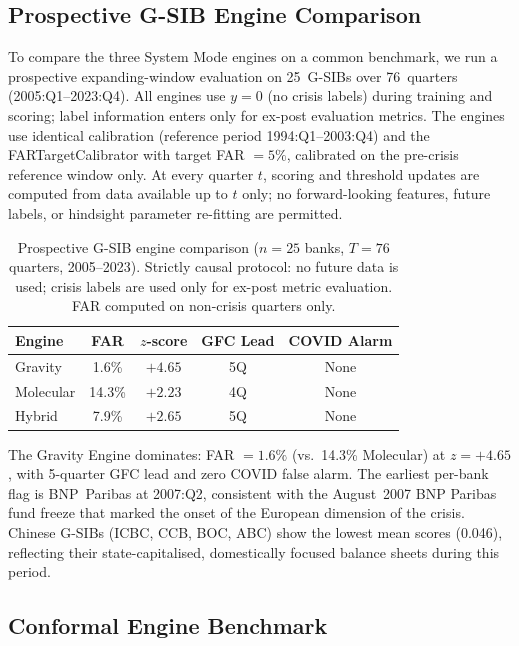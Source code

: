 \documentclass[final]{siamltex}
\begin{document}
\subsection{Prospective G-SIB Engine Comparison}\label{sec:hindsight}

To compare the three System Mode engines on a common benchmark,
we run a prospective expanding-window evaluation on 25~G-SIBs
over 76~quarters (2005:Q1--2023:Q4).  All engines use $y = 0$
(no crisis labels) during training and scoring; label
information enters only for ex-post evaluation metrics.  The
engines use identical calibration (reference period
1994:Q1--2003:Q4) and the FARTargetCalibrator with target
FAR $= 5\%$, calibrated on the pre-crisis reference window
only.
At every quarter $t$, scoring and threshold updates are computed
from data available up to $t$ only; no forward-looking features,
future labels, or hindsight parameter re-fitting are permitted.

\begin{table}[htbp]
\centering
\caption{Prospective G-SIB engine comparison ($n = 25$ banks,
$T = 76$ quarters, 2005--2023).  Strictly causal protocol:
no future data is used;
crisis labels are used only for ex-post metric evaluation.
FAR computed on non-crisis quarters only.}
\label{tab:hindsight}
\begin{tabular}{@{}lcccc@{}}
\toprule
Engine & FAR & $z$-score & GFC Lead & COVID Alarm\\
\midrule
Gravity     & 1.6\% & $+4.65$ & 5Q & None\\
Molecular   & 14.3\% & $+2.23$ & 4Q & None\\
Hybrid      & 7.9\% & $+2.65$ & 5Q & None\\
\bottomrule
\end{tabular}
\end{table}

The Gravity Engine dominates: FAR $= 1.6\%$ (vs.\ 14.3\%
Molecular) at $z = +4.65$, with 5-quarter GFC lead and zero
COVID false alarm.  The earliest per-bank flag is BNP~Paribas
at 2007:Q2, consistent with the August~2007 BNP Paribas
fund freeze that marked the onset of the European dimension
of the crisis.  Chinese G-SIBs (ICBC, CCB, BOC, ABC) show
the lowest mean scores (0.046), reflecting their
state-capitalised, domestically focused balance sheets during
this period.

\subsection{Conformal Engine Benchmark}\label{sec:conformal_bench}
\end{document}
